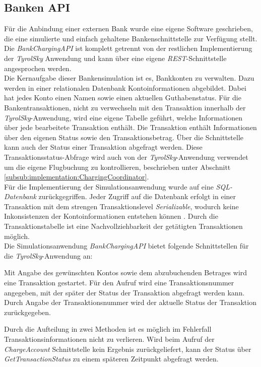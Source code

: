 \subsection{Banken API}
\label{subsec:implementation:bankApi}
Für die Anbindung einer externen Bank wurde eine eigene Software geschrieben, die eine simulierte und einfach gehaltene  Bankenschnittstelle zur Verfügung stellt. Die \textit{BankChargingAPI} ist komplett getrennt von der restlichen Implementierung der \textit{TyrolSky} Anwendung und kann über eine eigene \textit{REST}-Schnittstelle angesprochen werden. \\
Die Kernaufgabe dieser Bankensimulation ist es, Bankkonten zu verwalten. Dazu werden in einer relationalen Datenbank Kontoinformationen abgebildet. Dabei hat jedes Konto einen Namen sowie einen aktuellen Guthabenstatus. Für die Bankentransaktionen, nicht zu verwechseln mit den Transaktion innerhalb der \textit{TyrolSky}-Anwendung, wird eine eigene Tabelle geführt, welche Informationen über jede bearbeitete Transaktion enthält. Die Transaktion enthält Informationen über den eigenen Status sowie den Transaktionsbetrag. Über die Schnittstelle kann auch der Status einer Transaktion abgefragt werden. Diese Transaktionsstatus-Abfrage wird auch von der \textit{TyrolSky}-Anwendung verwendet um die eigene Flugbuchung zu kontrollieren, beschrieben unter Abschnitt \ref{subsub:implementation:ChargingCoordinator}. \\
Für die Implementierung der Simulationsanwendung wurde auf eine \textit{SQL-Datenbank} zurückgegriffen. Jeder Zugriff auf die Datenbank erfolgt in einer Transaktion mit dem strengen Transaktionslevel \textit{Serializable}, wodurch keine Inkonsistenzen der Kontoinformationen entstehen können \citep{adya2000generalized}. Durch die Transaktionstabelle ist eine Nachvollziehbarkeit der getätigten Transaktionen möglich. \\
Die Simulationsanwendung \textit{BankChargingAPI} bietet folgende Schnittstellen für die \textit{TyrolSky}-Anwendung an:
\begin{itemize}
        Mit Angabe des gewünschten Kontos sowie dem abzubuchenden Betrages wird eine Transaktion gestartet. Für den Aufruf wird eine Transaktionsnummer angegeben, mit der später der Status der Transaktion abgefragt werden kann.
        Durch Angabe der Transaktionsnummer wird der aktuelle Status der Transaktion zurückgegeben. 
\end{itemize}
Durch die Aufteilung in zwei Methoden ist es möglich im Fehlerfall Transaktionsinformationen nicht zu verlieren. Wird beim Aufruf der \textit{ChargeAccount} Schnittstelle kein Ergebnis zurückgeliefert, kann der Status über \textit{GetTransactionStatus} zu einem späteren Zeitpunkt abgefragt werden.

